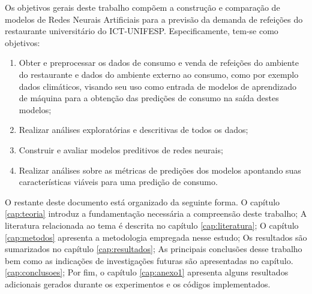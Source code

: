 Os objetivos gerais deste trabalho compõem a construção e comparação de modelos de Redes Neurais Artificiais para a previsão da demanda de refeições do restaurante universitário do ICT-UNIFESP. Especificamente, tem-se como objetivos:
\begin{enumerate}[label=\alph*)]
\item Obter e preprocessar os dados de consumo e venda de refeições do ambiente do restaurante e dados do ambiente externo ao consumo, como por exemplo dados climáticos, visando seu uso como entrada de modelos de aprendizado de máquina para a obtenção das predições de consumo na saída destes modelos;
\item Realizar análises exploratórias e descritivas de todos os dados;
\item Construir e avaliar modelos preditivos de redes neurais;
\item Realizar análises sobre as métricas de predições dos modelos apontando suas características viáveis para uma predição de consumo.
\end{enumerate}

O restante deste documento está organizado da seguinte forma. O capítulo \ref{cap:teoria} introduz a fundamentação necessária a compreensão deste trabalho; A literatura relacionada ao tema é descrita no capítulo \ref{cap:literatura}; O capítulo \ref{cap:metodos} apresenta a metodologia empregada nesse estudo; Os resultados são sumarizados no capítulo \ref{cap:resultados}; As principais conclusões desse trabalho bem como as indicações de investigações futuras são apresentadas no capítulo. \ref{cap:conclusoes}; Por fim, o capítulo \ref{cap:anexo1} apresenta alguns resultados adicionais gerados durante os experimentos e os códigos implementados.